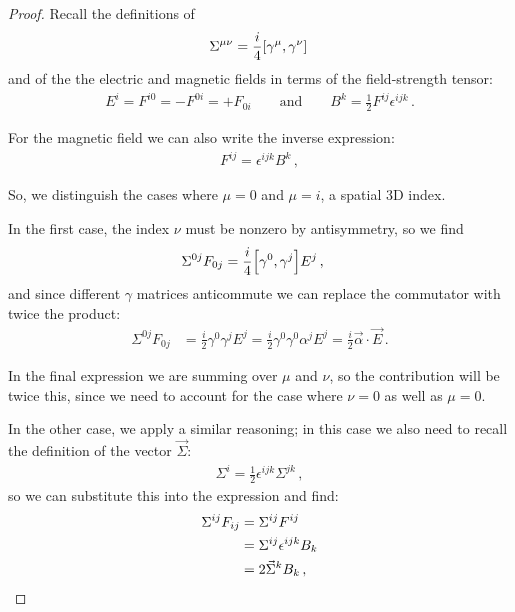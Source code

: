 \documentclass[main.tex]{subfiles}
\begin{document}
\begin{proof}
Recall the definitions of 
%
\begin{align}
\Sigma^{\mu \nu } = \frac{i}{4} \qty[\gamma^{\mu }, \gamma^{\nu }]
\,
\end{align}
%
and of the the electric and magnetic fields in terms of the field-strength tensor: 
%
\begin{align}
E^{i} = F^{i0} = - F^{0i} = +F_{0i}
\qquad \text{and} \qquad
B^{k} = \frac{1}{2} F^{ij} \epsilon^{ijk}
\,.
\end{align}

For the magnetic field we can also write the inverse expression: 
%
\begin{align}
F^{ij} = \epsilon^{ijk} B^{k}
\,,
\end{align}
%


So, we distinguish the cases where \(\mu = 0\) and \(\mu = i\), a spatial 3D index.

In the first case, the index \(\nu \) must be nonzero by antisymmetry, so we find
%
\begin{align}
\Sigma^{0j}F_{0j} &= \frac{i}{4} \qty[\gamma^{0}, \gamma^{j}] E^{j}
\,,
\end{align}
%
and since different \(\gamma \) matrices anticommute we can replace the commutator with twice the product: 
%
\begin{align}
\Sigma^{0j} F_{0j} &= \frac{i}{2} \gamma^{0} \gamma^{j} E^{j} = \frac{i}{2} \gamma^{0} \gamma^{0} \alpha^{j} E^{j} = \frac{i}{2} \vec{\alpha} \cdot \vec{E}
\,.
\end{align}

In the final expression we are summing over \(\mu \) and \(\nu \), so the contribution will be twice this, since we need to account for the case where \(\nu =0\) as well as \(\mu =0 \).

In the other case, we apply a similar reasoning; in this case we also need to recall the definition of the vector \(\vec{\Sigma}\): 
%
\begin{align}
\Sigma^{i} = \frac{1}{2} \epsilon^{ijk} \Sigma^{jk}
\,,
\end{align}
%
so we can substitute this into the expression and find:
%
\begin{align}
\Sigma^{ij} F_{ij} &= \Sigma^{ij} F^{ij}  \\
&= \Sigma^{ij} \tensor{\epsilon }{^{ijk}} B_{k}  \\
&= 2 \vec{\Sigma}^{k} B_{k}
\,,
\end{align}
%
\end{proof}
\end{document}
